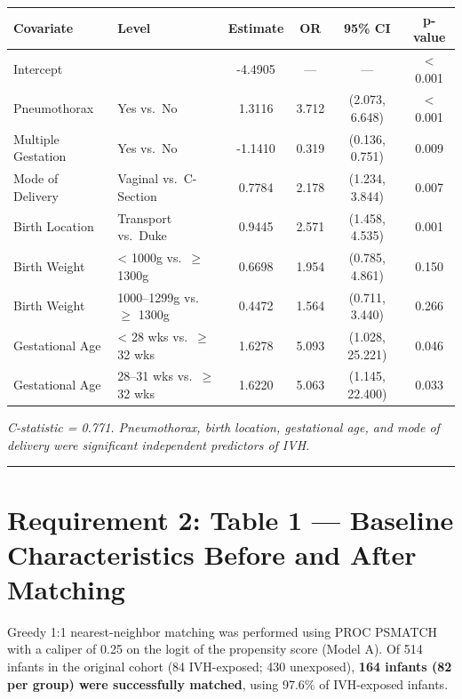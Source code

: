 \documentclass[
]{article}
\begin{document}
\begin{longtable}[]{@{}llcccc@{}}
\toprule
Covariate & Level & Estimate & OR & 95\% CI & p-value \\
\midrule
\endhead
Intercept & & -4.4905 & --- & --- & \textless{} 0.001 \\
Pneumothorax & Yes vs.~No & 1.3116 & 3.712 & (2.073, 6.648) &
\textless{} 0.001 \\
Multiple Gestation & Yes vs.~No & -1.1410 & 0.319 & (0.136, 0.751) &
0.009 \\
Mode of Delivery & Vaginal vs.~C-Section & 0.7784 & 2.178 & (1.234,
3.844) & 0.007 \\
Birth Location & Transport vs.~Duke & 0.9445 & 2.571 & (1.458, 4.535) &
0.001 \\
Birth Weight & \textless{} 1000g vs.~\(\geq\) 1300g & 0.6698 & 1.954 &
(0.785, 4.861) & 0.150 \\
Birth Weight & 1000--1299g vs.~\(\geq\) 1300g & 0.4472 & 1.564 & (0.711,
3.440) & 0.266 \\
Gestational Age & \textless{} 28 wks vs.~\(\geq\) 32 wks & 1.6278 &
5.093 & (1.028, 25.221) & 0.046 \\
Gestational Age & 28--31 wks vs.~\(\geq\) 32 wks & 1.6220 & 5.063 &
(1.145, 22.400) & 0.033 \\
\bottomrule
\end{longtable}

\emph{C-statistic = 0.771. Pneumothorax, birth location, gestational
age, and mode of delivery were significant independent predictors of
IVH.}

\begin{center}\rule{0.5\linewidth}{0.5pt}\end{center}

\hypertarget{requirement-2-table-1-baseline-characteristics-before-and-after-matching}{%
\section{Requirement 2: Table 1 --- Baseline Characteristics Before and
After
Matching}\label{requirement-2-table-1-baseline-characteristics-before-and-after-matching}}

Greedy 1:1 nearest-neighbor matching was performed using PROC PSMATCH
with a caliper of 0.25 on the logit of the propensity score (Model A).
Of 514 infants in the original cohort (84 IVH-exposed; 430 unexposed),
\textbf{164 infants (82 per group) were successfully matched}, using
97.6\% of IVH-exposed infants.
\end{document}
